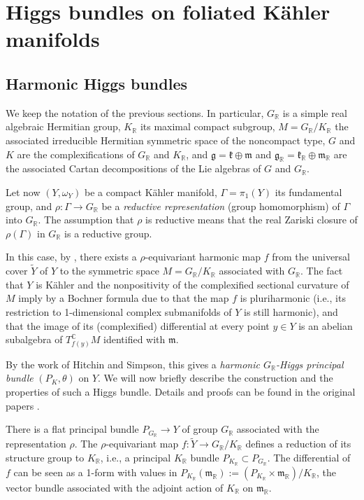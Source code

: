 \section{Higgs bundles on foliated Kähler manifolds}
\subsection{Harmonic Higgs bundles}
We keep the notation of the previous sections. In particular, $G_{\mathbb R}$ is a simple real algebraic Hermitian group, $K_{\mathbb R}$ its maximal compact subgroup, $M=G_{\mathbb R}/K_{\mathbb R}$ the associated irreducible Hermitian symmetric space of the noncompact type, $G$ and $K$ are the complexifications of $G_{\mathbb R}$ and $K_{\mathbb R}$, and $\mathfrak g=\mathfrak k\oplus\mathfrak m$ and $\mathfrak g_{\mathbb R}=\mathfrak k_{\mathbb R}\oplus\mathfrak m_{\mathbb R}$ are the associated Cartan decompositions of the Lie algebras of $G$ and $G_{\mathbb R}$.

Let now $(Y,\omega_Y)$ be a compact Kähler manifold, $\Gamma=\pi_1(Y)$ its fundamental group, and $\rho:\Gamma\to G_{\mathbb R}$ be a \emph{reductive representation} (group homomorphism) of $\Gamma$ into $G_{\mathbb R}$. The assumption that $\rho$ is reductive means that the real Zariski closure of $\rho(\Gamma)$ in $G_{\mathbb R}$ is a reductive group.

In this case, by \cite{jep93Cor88}, there exists a $\rho$-equivariant harmonic map $f$ from the universal cover $\widetilde Y$ of $Y$ to the symmetric space $M=G_{\mathbb R}/K_{\mathbb R}$ associated with $G_{\mathbb R}$. The fact that $Y$ is Kähler and the nonpositivity of the complexified sectional curvature of $M$ imply by a Bochner formula due to \cite{jep93Sam78,jep93Siu80} that the map $f$ is pluriharmonic (i.e., its restriction to 1-dimensional complex submanifolds of $Y$ is still harmonic), and that the image of its (complexified) differential at every point $y\in Y$ is an abelian subalgebra of $T^{\mathbb C}_{f(y)}M$ identified with $\mathfrak m$.

By the work of Hitchin and Simpson, this gives a \emph{harmonic $G_{\mathbb R}$-Higgs principal bundle} $(P_K,\theta)$ on $Y$. We will now briefly describe the construction and the properties of such a Higgs bundle. Details and proofs can be found in the original papers \cite{jep93Hit87,jep93Hit92,jep93Sim88,jep93Sim92}.

There is a flat principal bundle $P_{G_{\mathbb R}}\to Y$ of group $G_{\mathbb R}$ associated with the representation $\rho$. The $\rho$-equivariant map $f:\widetilde Y\to G_{\mathbb R}/K_{\mathbb R}$ defines a reduction of its structure group to $K_{\mathbb R}$, i.e., a principal $K_{\mathbb R}$ bundle $P_{K_{\mathbb R}}\subset P_{G_{\mathbb R}}$. The differential of $f$ can be seen as a 1-form with values in $P_{K_{\mathbb R}}(\mathfrak m_{\mathbb R}):=(P_{K_{\mathbb R}}\times\mathfrak m_{\mathbb R})/K_{\mathbb R}$, the vector bundle associated with the adjoint action of $K_{\mathbb R}$ on $\mathfrak m_{\mathbb R}$.

